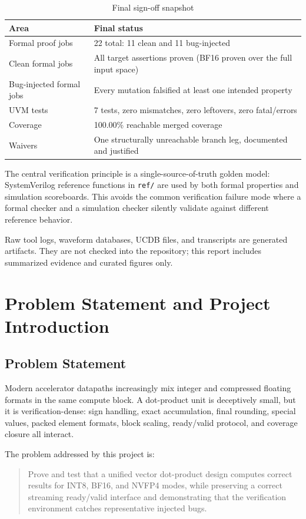 \documentclass[11pt,oneside]{report}
\newcommand{\artifactnote}{Raw tool logs, waveform databases, UCDB files, and transcripts are generated artifacts. They are not checked into the repository; this report includes summarized evidence and curated figures only.}
\begin{document}
\begin{table}[H]
\centering
\caption{Final sign-off snapshot}
\begin{tabular}{ll}
\toprule
\textbf{Area} & \textbf{Final status} \\
\midrule
Formal proof jobs & 22 total: 11 clean and 11 bug-injected \\
Clean formal jobs & All target assertions proven (BF16 proven over the full input space) \\
Bug-injected formal jobs & Every mutation falsified at least one intended property \\
UVM tests & 7 tests, zero mismatches, zero leftovers, zero fatal/errors \\
Coverage & 100.00\% reachable merged coverage \\
Waivers & One structurally unreachable branch leg, documented and justified \\
\bottomrule
\end{tabular}
\end{table}

The central verification principle is a single-source-of-truth golden model:
SystemVerilog reference functions in \texttt{ref/} are used by both formal
properties and simulation scoreboards. This avoids the common verification
failure mode where a formal checker and a simulation checker silently validate
against different reference behavior.

\artifactnote

\chapter{Problem Statement and Project Introduction}

\section{Problem Statement}

Modern accelerator datapaths increasingly mix integer and compressed floating
formats in the same compute block. A dot-product unit is deceptively small, but
it is verification-dense: sign handling, exact accumulation, final rounding,
special values, packed element formats, block scaling, ready/valid protocol, and
coverage closure all interact.

The problem addressed by this project is:

\begin{quote}
Prove and test that a unified vector dot-product design computes correct results
for INT8, BF16, and NVFP4 modes, while preserving a correct streaming
ready/valid interface and demonstrating that the verification environment catches
representative injected bugs.
\end{quote}
\end{document}
